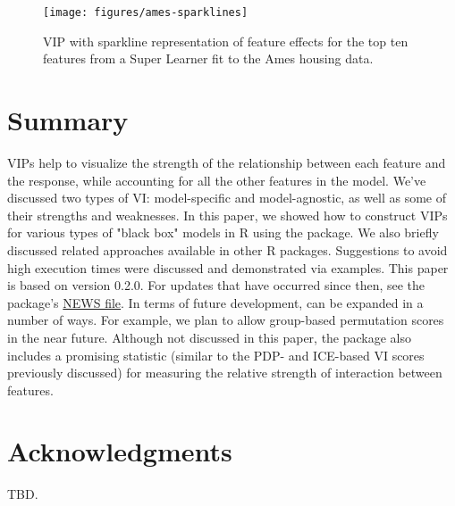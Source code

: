 \begin{figure}[!htb]
  \centering 
  \texttt{[image: figures/ames-sparklines]} 
  \caption{VIP with sparkline representation of feature effects for the top ten features from a Super Learner fit to the Ames housing data.}
  \label{fig:sparklines}
\end{figure}


\section{Summary}

VIPs help to visualize the strength of the relationship between each feature and the response, while accounting for all the other features in the model. We've discussed two types of VI: model-specific and model-agnostic, as well as some of their strengths and weaknesses. In this paper, we showed how
to construct VIPs for various types of "black box" models in R using the  package. We also briefly
discussed related approaches available in other R packages. Suggestions to avoid
high execution times were discussed and demonstrated via examples. This paper is based on  version 0.2.0. For updates that have occurred since then, see the package’s \href{https://cran.r-project.org/web/packages/vip/news/news.html}{NEWS file}. In terms of future development,  can be expanded in a number of ways. For
example, we plan to allow group-based permutation scores in the near future. Although not discussed in this paper, the package also includes a promising statistic (similar to the PDP- and ICE-based VI scores previously discussed) for measuring the relative strength of interaction between features. 


\section{Acknowledgments}

TBD.




\address{Brandon M. Greenwell\\
  Department of Mathematics and Statistics\\
  Wright State University\\
  3640 Colonel Glenn Hwy\\ 
  Dayton, OH 45435\\
  United States of America\\
  ORCiD: \href{https://orcid.org/0000-0002-8120-0084}{0000-0002-8120-0084}\\
  }

\address{Bradley C. Boehmke\\
  University of Cincinnati\\
  2925 Campus Green Dr\\
  Cincinnati, OH 45221\\
  United States of America\\
  ORCiD: \href{https://orcid.org/0000-0002-3611-8516}{0000-0002-3611-8516}\\
  }
